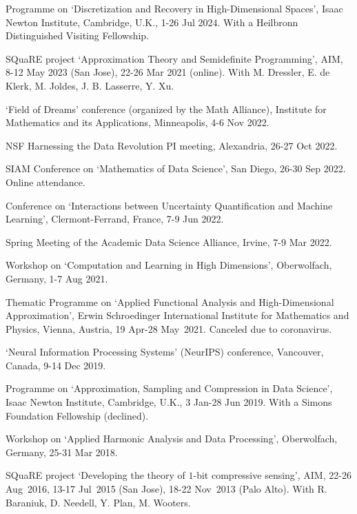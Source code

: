 \documentclass[11pt]{article}
\begin{document}
\bitemize
\item Programme on `Discretization and Recovery in High-Dimensional Spaces',
Isaac Newton Institute, Cambridge, U.K., 1-26 Jul 2024.
With a Heilbronn Distinguished Visiting Fellowship.
\item SQuaRE project `Approximation Theory and Semidefinite Programming', AIM,  8-12 May 2023 (San Jose), 22-26 Mar 2021 (online). With M. Dressler, E. de Klerk, M. Joldes, J. B. Lasserre, Y. Xu.
\item `Field of Dreams' conference (organized by the Math Alliance),
Institute for Mathematics and its Applications, Minneapolis,  4-6 Nov 2022.
\item NSF Harnessing the Data Revolution PI meeting,
Alexandria,  26-27 Oct 2022.
\item SIAM Conference on `Mathematics of Data Science',
San Diego, 26-30 Sep 2022. Online attendance.
\item Conference on `Interactions between Uncertainty Quantification and Machine Learning',
Clermont-Ferrand, France, 7-9 Jun 2022.
\item Spring Meeting of the Academic Data Science Alliance, 
Irvine, 7-9 Mar 2022.
\item  Workshop on `Computation and Learning in High Dimensions', Oberwolfach, Germany, 1-7 Aug 2021.
\item Thematic Programme on `Applied Functional Analysis and High-Dimensional Approximation',
\mbox{Erwin} Schroedinger International Institute for Mathematics and Physics, Vienna, Austria, 
19 Apr-28 May~2021.
{\small Canceled due to coronavirus.}
\item `Neural Information Processing Systems' (NeurIPS) conference,
Vancouver, Canada, 9-14 Dec 2019.
\item Programme on `Approximation, Sampling and Compression in Data Science',
Isaac Newton Institute, Cambridge, U.K., 3 Jan-28 Jun 2019.
With a Simons Foundation Fellowship (declined).
\item  Workshop on `Applied Harmonic Analysis and Data Processing', Oberwolfach, Germany, 25-31 Mar 2018.
\item SQuaRE project `Developing the theory of $1$-bit compressive sensing',
AIM, 22-26 Aug~2016, 13-17 Jul~2015 (San Jose), 18-22 Nov~2013 (Palo Alto). With R. Baraniuk, D. Needell, Y. Plan, M. Wooters.
\end{document}
